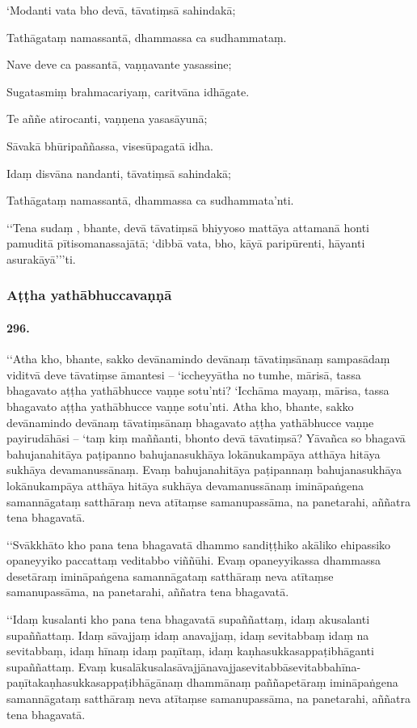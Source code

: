 ‘Modanti vata bho devā, tāvatiṃsā sahindakā;

Tathāgataṃ namassantā, dhammassa ca sudhammataṃ.

Nave deve ca passantā, vaṇṇavante yasassine;

Sugatasmiṃ brahmacariyaṃ, caritvāna idhāgate.

Te aññe atirocanti, vaṇṇena yasasāyunā;

Sāvakā bhūripaññassa, visesūpagatā idha.

Idaṃ disvāna nandanti, tāvatiṃsā sahindakā;

Tathāgataṃ namassantā, dhammassa ca sudhammata’nti.

‘‘Tena sudaṃ , bhante, devā tāvatiṃsā bhiyyoso mattāya attamanā honti pamuditā pītisomanassajātā; ‘dibbā vata, bho, kāyā paripūrenti, hāyanti asurakāyā’’’ti.

\subsubsection{Aṭṭha yathābhuccavaṇṇā}

\paragraph{296.} ‘‘Atha kho, bhante, sakko devānamindo devānaṃ tāvatiṃsānaṃ sampasādaṃ viditvā deve tāvatiṃse āmantesi – ‘iccheyyātha no tumhe, mārisā, tassa bhagavato aṭṭha yathābhucce vaṇṇe sotu’nti? ‘Icchāma mayaṃ, mārisa, tassa bhagavato aṭṭha yathābhucce vaṇṇe sotu’nti. Atha kho, bhante, sakko devānamindo devānaṃ tāvatiṃsānaṃ bhagavato aṭṭha yathābhucce vaṇṇe payirudāhāsi – ‘taṃ kiṃ maññanti, bhonto devā tāvatiṃsā? Yāvañca so bhagavā bahujanahitāya paṭipanno bahujanasukhāya lokānukampāya atthāya hitāya sukhāya devamanussānaṃ. Evaṃ bahujanahitāya paṭipannaṃ bahujanasukhāya lokānukampāya atthāya hitāya sukhāya devamanussānaṃ imināpaṅgena samannāgataṃ satthāraṃ neva atītaṃse samanupassāma, na panetarahi, aññatra tena bhagavatā.

‘‘Svākkhāto kho pana tena bhagavatā dhammo sandiṭṭhiko akāliko ehipassiko opaneyyiko paccattaṃ veditabbo viññūhi. Evaṃ opaneyyikassa dhammassa desetāraṃ imināpaṅgena samannāgataṃ satthāraṃ neva atītaṃse samanupassāma, na panetarahi, aññatra tena bhagavatā.

‘‘Idaṃ kusalanti kho pana tena bhagavatā supaññattaṃ, idaṃ akusalanti supaññattaṃ. Idaṃ sāvajjaṃ idaṃ anavajjaṃ, idaṃ sevitabbaṃ idaṃ na sevitabbaṃ, idaṃ hīnaṃ idaṃ paṇītaṃ, idaṃ kaṇhasukkasappaṭibhāganti supaññattaṃ. Evaṃ kusalākusalasāvajjānavajjasevitabbāsevitabbahīna-paṇītakaṇhasukkasappaṭibhāgānaṃ dhammānaṃ paññapetāraṃ imināpaṅgena samannāgataṃ satthāraṃ neva atītaṃse samanupassāma, na panetarahi, aññatra tena bhagavatā.

